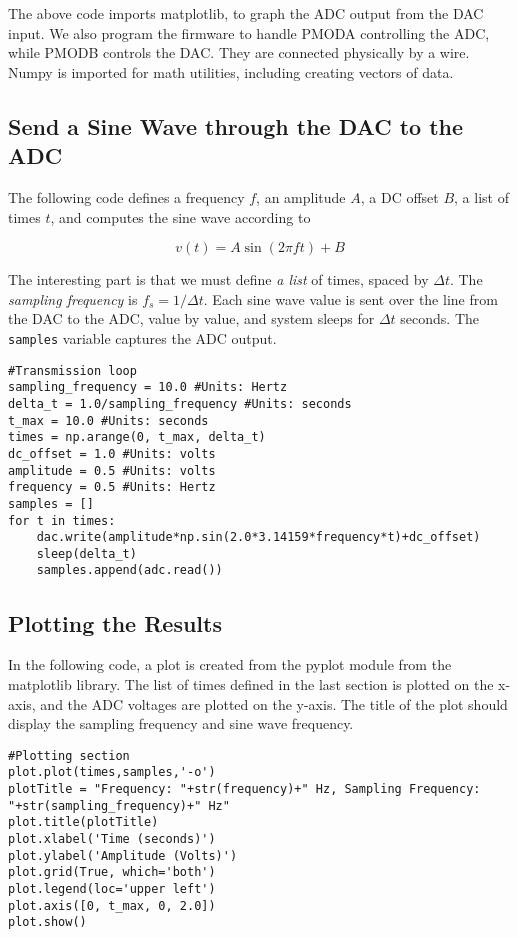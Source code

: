 \documentclass{article}
\begin{document}
The above code imports matplotlib, to graph the ADC output from the DAC input.  We also program the firmware to handle PMODA controlling the ADC, while PMODB controls the DAC.  They are connected physically by a wire.  Numpy is imported for math utilities, including creating vectors of data.

\subsection{Send a Sine Wave through the DAC to the ADC}

The following code defines a frequency $f$, an amplitude $A$, a DC offset $B$, a list of times $t$, and computes the sine wave according to

\begin{equation}
v(t) = A\sin(2\pi ft) + B
\end{equation}

The interesting part is that we must define \textit{a list} of times, spaced by $\Delta t$.  The \textit{sampling frequency} is $f_s = 1/\Delta t$.  Each sine wave value is sent over the line from the DAC to the ADC, value by value, and system sleeps for $\Delta t$ seconds.  The \verb+samples+ variable captures the ADC output.

\begin{verbatim}
#Transmission loop
sampling_frequency = 10.0 #Units: Hertz
delta_t = 1.0/sampling_frequency #Units: seconds
t_max = 10.0 #Units: seconds
times = np.arange(0, t_max, delta_t)
dc_offset = 1.0 #Units: volts
amplitude = 0.5 #Units: volts
frequency = 0.5 #Units: Hertz
samples = []
for t in times:
    dac.write(amplitude*np.sin(2.0*3.14159*frequency*t)+dc_offset)
    sleep(delta_t)
    samples.append(adc.read())
\end{verbatim}

\subsection{Plotting the Results}

In the following code, a plot is created from the pyplot module from the matplotlib library.  The list of times defined in the last section is plotted on the x-axis, and the ADC voltages are plotted on the y-axis.  The title of the plot should display the sampling frequency and sine wave frequency.

\begin{verbatim}
#Plotting section
plot.plot(times,samples,'-o')
plotTitle = "Frequency: "+str(frequency)+" Hz, Sampling Frequency: "+str(sampling_frequency)+" Hz"
plot.title(plotTitle)
plot.xlabel('Time (seconds)')
plot.ylabel('Amplitude (Volts)')
plot.grid(True, which='both') 
plot.legend(loc='upper left')
plot.axis([0, t_max, 0, 2.0])
plot.show()
\end{verbatim}
\end{document}

